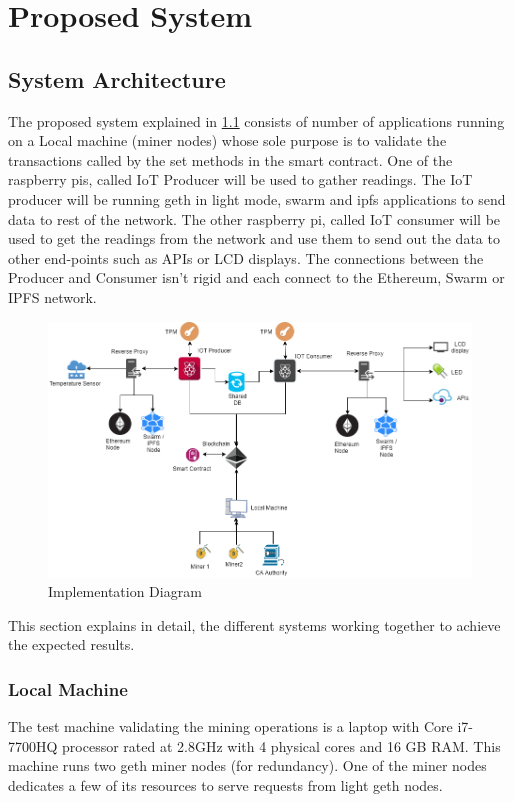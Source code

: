 \documentclass[11pt,openright]{report}
\begin{document}
\chapter{Proposed System} \label{chapter:proposed_system}
\section{System Architecture} \label{ss:construct_architecture}
The proposed system explained in \ref{fig:impldiagram_architechture} consists of number of applications running on a Local machine (miner nodes) whose sole purpose is to validate the transactions called by the set methods in the smart contract. One of the raspberry pis, called IoT Producer will be used to gather readings. The IoT producer will be running geth in light mode, swarm and ipfs applications to send data to rest of the network. The other raspberry pi, called IoT consumer will be used to get the readings from the network and use them to send out the data to other end-points such as APIs or LCD displays. The connections between the Producer and Consumer isn't rigid and each connect to the Ethereum, Swarm or IPFS network.

\begin{figure}
	\centering
	\includegraphics[scale=0.5]{images/Final_Implementationv2.png}
	\caption{Implementation Diagram}
	\label{fig:impldiagram_architechture}
\end{figure}


This section explains in detail, the different systems working together to achieve the expected results.

\subsection{Local Machine}
The test machine validating the mining operations is a laptop with Core i7-7700HQ processor rated at 2.8GHz with 4 physical cores and 16 GB RAM. This machine runs two geth miner nodes (for redundancy). One of the miner nodes dedicates a few of its resources to serve requests from light geth nodes.
\end{document}
